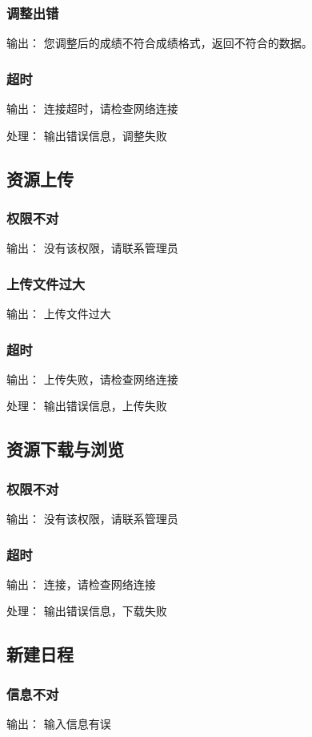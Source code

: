 \subsubsection{调整出错}
输出： 您调整后的成绩不符合成绩格式，返回不符合的数据。
\subsubsection{超时}
输出： 连接超时，请检查网络连接

处理： 输出错误信息，调整失败

\subsection{资源上传}
\subsubsection{权限不对}
输出： 没有该权限，请联系管理员
\subsubsection{上传文件过大}
输出： 上传文件过大
\subsubsection{超时}
输出： 上传失败，请检查网络连接

处理： 输出错误信息，上传失败

\subsection{资源下载与浏览}
\subsubsection{权限不对}
输出： 没有该权限，请联系管理员
\subsubsection{超时}
输出： 连接，请检查网络连接

处理： 输出错误信息，下载失败

\subsection{新建日程}
\subsubsection{信息不对}
输出： 输入信息有误
